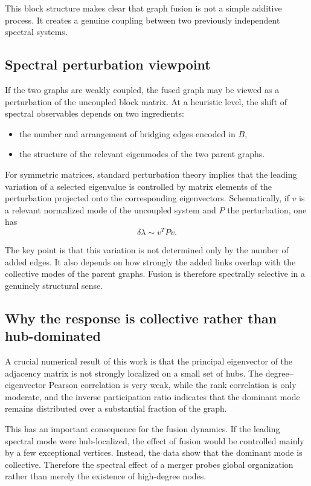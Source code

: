 \documentclass[11pt]{article}
\begin{document}
This block structure makes clear that graph fusion is not a simple additive process.
It creates a genuine coupling between two previously independent spectral systems.

\subsection{Spectral perturbation viewpoint}

If the two graphs are weakly coupled, the fused graph may be viewed as a perturbation of the uncoupled block matrix.
At a heuristic level, the shift of spectral observables depends on two ingredients:

\begin{itemize}
\item the number and arrangement of bridging edges encoded in $B$,
\item the structure of the relevant eigenmodes of the two parent graphs.
\end{itemize}

For symmetric matrices, standard perturbation theory implies that the leading variation of a selected eigenvalue is controlled by matrix elements of the perturbation projected onto the corresponding eigenvectors.
Schematically, if $v$ is a relevant normalized mode of the uncoupled system and $P$ the perturbation, one has
\[
\delta \lambda \sim v^T P v.
\]

The key point is that this variation is not determined only by the number of added edges.
It also depends on how strongly the added links overlap with the collective modes of the parent graphs.
Fusion is therefore spectrally selective in a genuinely structural sense.

\subsection{Why the response is collective rather than hub-dominated}

A crucial numerical result of this work is that the principal eigenvector of the adjacency matrix is not strongly localized on a small set of hubs.
The degree--eigenvector Pearson correlation is very weak, while the rank correlation is only moderate, and the inverse participation ratio indicates that the dominant mode remains distributed over a substantial fraction of the graph.

This has an important consequence for the fusion dynamics.
If the leading spectral mode were hub-localized, the effect of fusion would be controlled mainly by a few exceptional vertices.
Instead, the data show that the dominant mode is collective.
Therefore the spectral effect of a merger probes global organization rather than merely the existence of high-degree nodes.
\end{document}
